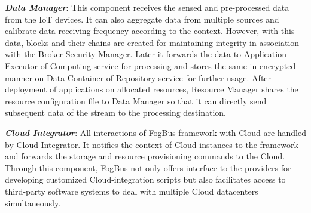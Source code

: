 \documentclass[final,5p,times,twocolumn]{elsarticle}
\begin{document}
%
\par \textbf{\textit{Data Manager}}: This component receives the sensed and pre-processed data from the IoT devices. It can also aggregate data from multiple sources and calibrate data receiving frequency according to the context. However, with this data, blocks and their chains are created for maintaining integrity in association with the Broker Security Manager. Later it forwards the data to Application Executor of Computing service for processing and stores the same in encrypted manner on Data Container of Repository service for further usage. After deployment of applications on allocated resources, Resource Manager shares the resource configuration file to Data Manager so that it can directly send subsequent data of the stream to the processing destination.
%
\par \textbf{\textit{Cloud Integrator}}: All interactions of FogBus framework with Cloud are handled by Cloud Integrator. It notifies the context of Cloud instances to the framework and forwards the storage and resource provisioning commands to the Cloud. Through this component, FogBus not only offers interface to the providers for developing customized Cloud-integration scripts but also facilitates access to third-party software systems to deal with multiple Cloud datacenters simultaneously. 
%
\end{document}
